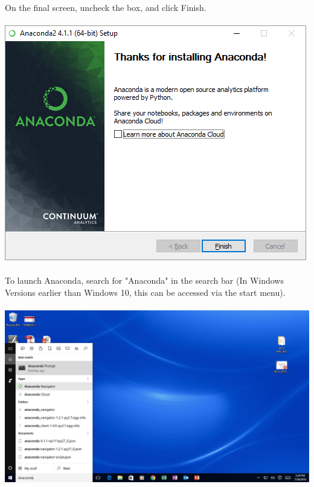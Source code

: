 \documentclass[]{article}
\begin{document}
\paragraph{}
On the final screen, uncheck the box, and click Finish.
\paragraph{}
\begin{centering}
    \centerline{\includegraphics[scale=0.7]{Screenshot_12.png}}
\end{centering}

\paragraph{}
To launch Anaconda, search for "Anaconda" in the search bar (In Windows Versions earlier than Windows 10, this can be accessed via the start menu).
\paragraph{}
\begin{centering}
    \centerline{\includegraphics[scale=0.35]{Screenshot_13.png}}
\end{centering}
\end{document}
